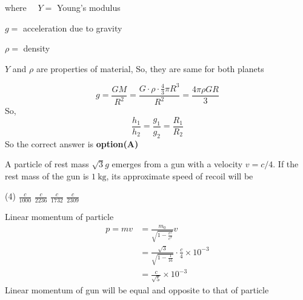 \begin{questions}
\begin{answer}
	where $\quad Y=$ Young's modulus
	
	$g=$ acceleration due to gravity
	
	$\rho=$ density
	
	$Y$ and $\rho$ are properties of material, So, they are same for both planets
	
	$$
	g=\frac{G M}{R^{2}}=\frac{G \cdot \rho \cdot \frac{4}{3} \pi R^{3}}{R^{2}}=\frac{4 \pi \rho G R}{3}
	$$
	So,
	$$
	\frac{h_{1}}{h_{2}}=\frac{g_{1}}{g_{2}}=\frac{R_{1}}{R_{2}}
	$$
	So the correct answer is \textbf{option(A)}
\end{answer}
\begin{minipage}{\textwidth}
	\question A particle of rest mass $\sqrt{3} g$ emerges from a gun with a velocity $v=c / 4$. If the rest mass of the gun is $1 \mathrm{~kg}$, its approximate speed of recoil will be
\end{minipage}
\begin{tasks}(4)
	\task[\textbf{A.}] $\frac{c}{1000}$
	\task[\textbf{B.}] $\frac{c}{2236}$
	\task[\textbf{C.}] $\frac{c}{1732}$
	\task[\textbf{D.}]   $\frac{c}{2309}$
\end{tasks}
\begin{answer}
	Linear momentum of particle
	$$
	\begin{aligned}
	p=m v &=\frac{m_{0}}{\sqrt{1-\frac{v^{2}}{c^{2}}}} v \\
	&=\frac{\sqrt{3}}{\sqrt{1-\frac{1}{16}}} \cdot \frac{c}{4} \times 10^{-3} \\
	&=\frac{c}{\sqrt{5}} \times 10^{-3}
	\end{aligned}
	$$
	Linear momentum of gun will be equal and opposite to that of particle
	

\end{answer}
\end{questions}
